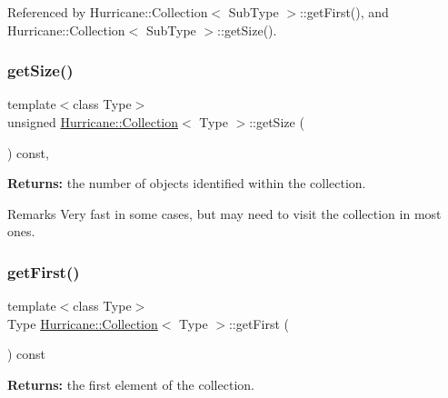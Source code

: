 Referenced by Hurricane\+::\+Collection$<$ Sub\+Type $>$\+::get\+First(), and Hurricane\+::\+Collection$<$ Sub\+Type $>$\+::get\+Size().

\mbox{\label{classHurricane_1_1Collection_a1292aabe88c9aadfdfe21dabddb62c19}} 
\subsubsection{\texorpdfstring{get\+Size()}{getSize()}}
{\footnotesize\ttfamily template$<$class Type$>$ \\
unsigned \mbox{\hyperlink{classHurricane_1_1Collection}{Hurricane\+::\+Collection}}$<$ Type $>$\+::get\+Size (\begin{DoxyParamCaption}{ }\end{DoxyParamCaption}) const\hspace{0.3cm}{\ttfamily [inline]}, {\ttfamily [virtual]}}

{\bfseries Returns\+:} the number of objects identified within the collection.

\begin{DoxyRemark}{Remarks}
Very fast in some cases, but may need to visit the collection in most ones. 
\end{DoxyRemark}
\mbox{\label{classHurricane_1_1Collection_a846a042646e02a0f77d2ce0f6190288a}} 
\subsubsection{\texorpdfstring{get\+First()}{getFirst()}}
{\footnotesize\ttfamily template$<$class Type$>$ \\
Type \mbox{\hyperlink{classHurricane_1_1Collection}{Hurricane\+::\+Collection}}$<$ Type $>$\+::get\+First (\begin{DoxyParamCaption}{ }\end{DoxyParamCaption}) const\hspace{0.3cm}{\ttfamily [inline]}}

{\bfseries Returns\+:} the first element of the collection.


